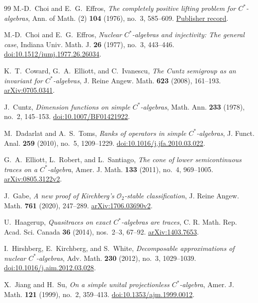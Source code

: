 \begin{thebibliography}{99}
M.-D.~Choi and E.~G.~Effros,
\emph{The completely positive lifting problem for \(C^*\)-algebras},
Ann. of Math. (2) \textbf{104} (1976), no.~3, 585--609.
\href{https://annals.math.princeton.edu/1976/104-3/p08}{Publisher record}.

M.-D.~Choi and E.~G.~Effros,
\emph{Nuclear $C^*$-algebras and injectivity: The general case},
Indiana Univ. Math. J. \textbf{26} (1977), no.~3, 443--446.
\href{https://doi.org/10.1512/iumj.1977.26.26034}{doi:10.1512/iumj.1977.26.26034}.

K.~T.~Coward, G.~A.~Elliott, and C.~Ivanescu,
\emph{The Cuntz semigroup as an invariant for \(C^*\)-algebras},
J. Reine Angew. Math. \textbf{623} (2008), 161--193.
\href{https://arxiv.org/abs/0705.0341}{arXiv:0705.0341}.

J.~Cuntz, \emph{Dimension functions on simple $C^*$-algebras},
Math. Ann. \textbf{233} (1978), no.~2, 145--153.
\href{https://doi.org/10.1007/BF01421922}{doi:10.1007/BF01421922}.

M.~Dadarlat and A.~S.~Toms, \emph{Ranks of operators in simple $C^*$-algebras},
J. Funct. Anal. \textbf{259} (2010), no.~5, 1209--1229.
\href{https://doi.org/10.1016/j.jfa.2010.03.022}{doi:10.1016/j.jfa.2010.03.022}.

G.~A.~Elliott, L.~Robert, and L.~Santiago,
\emph{The cone of lower semicontinuous traces on a \(C^*\)-algebra},
Amer. J. Math. \textbf{133} (2011), no.~4, 969--1005.
\href{https://arxiv.org/abs/0805.3122v2}{arXiv:0805.3122v2}.

J.~Gabe,
\emph{A new proof of Kirchberg's \(\mathcal O_2\)-stable classification},
J. Reine Angew. Math. \textbf{761} (2020), 247--289.
\href{https://arxiv.org/abs/1706.03690v2}{arXiv:1706.03690v2}.

U.~Haagerup,
\emph{Quasitraces on exact $C^*$-algebras are traces},
C. R. Math. Rep. Acad. Sci. Canada \textbf{36} (2014), nos.~2--3, 67--92.
\href{https://arxiv.org/abs/1403.7653}{arXiv:1403.7653}.

I.~Hirshberg, E.~Kirchberg, and S.~White,
\emph{Decomposable approximations of nuclear $C^*$-algebras},
Adv. Math. \textbf{230} (2012), no.~3, 1029--1039.
\href{https://doi.org/10.1016/j.aim.2012.03.028}{doi:10.1016/j.aim.2012.03.028}.

X.~Jiang and H.~Su,
\emph{On a simple unital projectionless \(C^*\)-algebra},
Amer. J. Math. \textbf{121} (1999), no.~2, 359--413.
\href{https://doi.org/10.1353/ajm.1999.0012}{doi:10.1353/ajm.1999.0012}.


\end{thebibliography}
